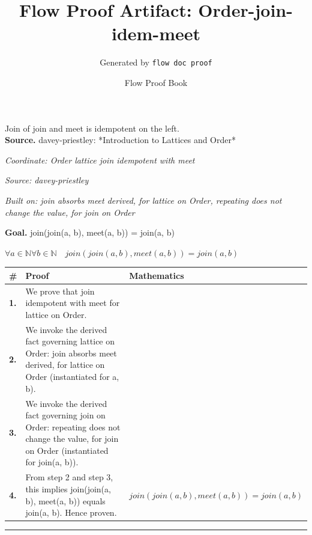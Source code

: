 \documentclass[11pt]{article}
\title{Flow Proof Artifact: Order-join-idem-meet}
\author{Generated by \texttt{flow doc proof}}
\date{Flow Proof Book}
\theoremstyle{definition}
\begin{document}
\maketitle
Join of join and meet is idempotent on the left.\\[0.5em]
\textbf{Source.} davey-priestley: *Introduction to Lattices and Order*\\[0.5em]
\bigskip
{}\par
\smallskip\noindent\textit{Coordinate: Order \cdot lattice \cdot join idempotent with meet}\par
\smallskip\noindent\textit{Source: davey-priestley}\par
\smallskip\noindent\textit{Built on: join absorbs meet derived, for lattice on Order, repeating does not change the value, for join on Order}\par
\medskip
\noindent\textbf{Goal.} join(join(a, b), meet(a, b)) = join(a, b)\par
\noindent$\displaystyle \forall a \in \mathbb{N} \forall b \in \mathbb{N}\quad join(join(a, b), meet(a, b)) = join(a, b)$\par
\medskip
\noindent
\begin{tabular}{@{} >{\raggedright\arraybackslash}p{} >{\raggedright\arraybackslash}p{} >{\raggedleft\arraybackslash}p{} @{}}
\textbf{\#} & \textbf{Proof} & \textbf{Mathematics} \\
\midrule
\textbf{1.} & We prove that join idempotent with meet for lattice on Order. & \\[0.45em]
\textbf{2.} & We invoke the derived fact governing lattice on Order: join absorbs meet derived, for lattice on Order (instantiated for a, b). & \\[0.45em]
\textbf{3.} & We invoke the derived fact governing join on Order: repeating does not change the value, for join on Order (instantiated for join(a, b)). & \\[0.45em]
\textbf{4.} & From step 2 and step 3, this implies join(join(a, b), meet(a, b)) equals join(a, b). Hence proven. & $\displaystyle join(join(a, b), meet(a, b)) = join(a, b)$ \\[0.45em]
\bottomrule
\end{tabular}
\label{thm:Order-lattice-join_idempotent_with_meet}
\par\medskip\hrule
\end{document}
